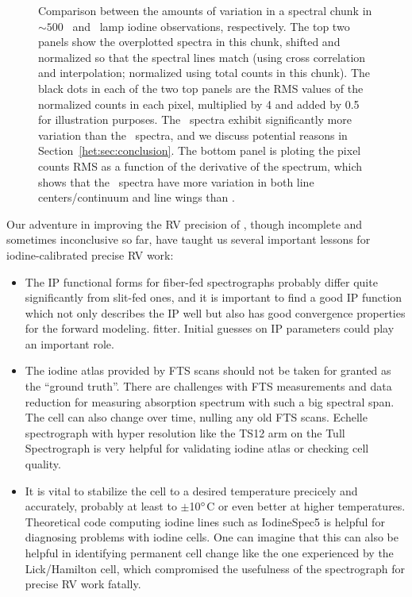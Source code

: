 \begin{figure}
\caption{Comparison between the amounts of variation in a spectral
chunk in $\sim 500$ \het\ and \keck\ lamp iodine observations,
respectively. The top two panels show the overplotted spectra in this
chunk, shifted and normalized so that the spectral lines match (using
cross correlation and interpolation; normalized using total counts in
this chunk). The black dots in each of the two top panels are the RMS
values of the normalized counts in each pixel, multiplied by 4 and
added by 0.5 for illustration purposes. The \het\ spectra exhibit
significantly more variation than the \keck\ spectra, and we discuss
potential reasons in Section~\ref{het:sec:conclusion}. The bottom
panel is ploting the pixel counts RMS as a function of the derivative
of the spectrum, which shows that the \het\ spectra have more
variation in both line centers/continuum and line wings than \keck.
\label{het:fig:chunkvary}}
\end{figure}

Our adventure in improving the RV precision of \het, though incomplete
and sometimes inconclusive so far, have taught us several important
lessons for iodine-calibrated precise RV work:

\begin{itemize}
  \item The IP functional forms for fiber-fed spectrographs probably
differ quite significantly from slit-fed ones, and it is important to
find a good IP function which not only describes the IP well but also
has good convergence properties for the forward modeling.
fitter. Initial guesses on IP parameters could play an important role.
  \item The iodine atlas provided by FTS scans should not be taken for
granted as the ``ground truth''. There are challenges with FTS
measurements and data reduction for measuring absorption spectrum with
such a big spectral span. The cell can also change over time, nulling
any old FTS scans. Echelle spectrograph with hyper resolution like the
TS12 arm on the Tull Spectrograph is very helpful for validating
iodine atlas or checking cell quality.
  \item It is vital to stabilize the cell to a desired temperature
precicely and accurately, probably at least to $\pm$10$^{\circ}$C or
even better at higher temperatures. Theoretical code computing iodine
lines such as IodineSpec5 is helpful for diagnosing problems with
iodine cells. One can imagine that this can also be helpful in
identifying permanent cell change like the one experienced by the
Lick/Hamilton cell, which compromised the usefulness of the
spectrograph for precise RV work fatally.
\end{itemize}

